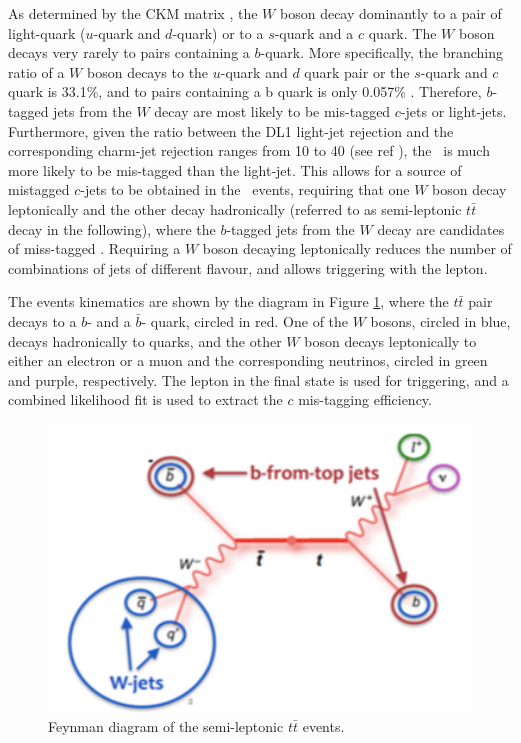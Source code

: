 \documentclass[letterpaper,12pt]{article}
\begin{document}
As determined by the CKM matrix \cite{CKM1,CKM2}, the $W$ boson decay dominantly to 
a pair of light-quark ($u$-quark and $d$-quark) or to
a $s$-quark and a $c$ quark. The $W$ boson decays very rarely to pairs containing a $b$-quark. 
More specifically, the branching ratio of a $W$ boson decays to the $u$-quark and $d$ quark pair or 
the $s$-quark and $c$ quark is 33.1\%, and to pairs containing a b quark is only 0.057\% \cite{PDG}. 
Therefore, $b$-tagged jets from the $W$ decay are most likely 
to be mis-tagged $c$-jets or light-jets. 
Furthermore, given the ratio between the DL1 light-jet rejection and the corresponding charm-jet rejection 
ranges from 10 to 40 (see ref \cite{ATL-PHYS-PUB-2017-013}), the 
\cjet\ is much more likely to be mis-tagged than the light-jet. 
This allows for a source of mistagged $c$-jets to be obtained in the \ttbar\ events, 
requiring that one $W$ boson decay leptonically and the other decay hadronically 
(referred to as semi-leptonic $t\bar{t}$ decay in the following),
where the $b$-tagged jets from the $W$ decay are candidates of miss-tagged \cjet.
Requiring a $W$ boson decaying leptonically 
reduces the number of combinations of jets of different flavour, 
and allows triggering with the lepton.

The events kinematics are shown by the diagram in 
Figure \ref{fig:feynman}, where the $t\bar{t}$ pair decays to a 
$b$- and a $\bar{b}$- quark, circled in red. One of the $W$ bosons, 
circled in blue, decays hadronically to quarks, 
and the other $W$ boson decays leptonically to either 
an electron or a muon and the corresponding neutrinos, 
circled in green and purple, respectively. The lepton in the final state is used for 
triggering, and a combined likelihood fit is used to extract the $c$ mis-tagging 
efficiency.

\begin{figure}[H]
\centering
\begin{minipage}[b]{.45\textwidth}
\centering
\includegraphics[width=1\textwidth]{feynman.png}
\end{minipage}
\caption{Feynman diagram of the semi-leptonic $t\bar{t}$ events.}
\label{fig:feynman}
\end{figure}
\end{document}
